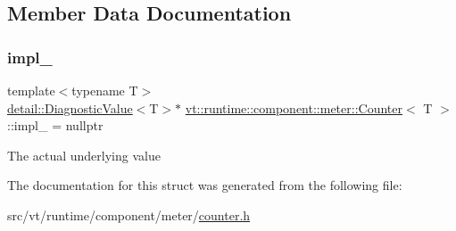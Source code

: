 \subsection{Member Data Documentation}
\mbox{\label{structvt_1_1runtime_1_1component_1_1meter_1_1_counter_a2e2b0b2a78c95c3017a571bd76310eba}} 
\subsubsection{\texorpdfstring{impl\+\_\+}{impl\_}}
{\footnotesize\ttfamily template$<$typename T$>$ \\
\hyperlink{structvt_1_1runtime_1_1component_1_1detail_1_1_diagnostic_value}{detail\+::\+Diagnostic\+Value}$<$T$>$$\ast$ \hyperlink{structvt_1_1runtime_1_1component_1_1meter_1_1_counter}{vt\+::runtime\+::component\+::meter\+::\+Counter}$<$ T $>$\+::impl\+\_\+ = nullptr\hspace{0.3cm}{\ttfamily [private]}}

The actual underlying value 

The documentation for this struct was generated from the following file\+:\begin{DoxyCompactItemize}
\item 
src/vt/runtime/component/meter/\hyperlink{counter_8h}{counter.\+h}\end{DoxyCompactItemize}
